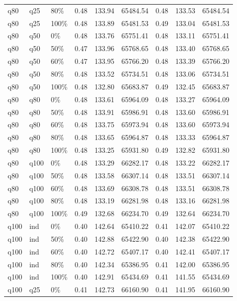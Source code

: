 \begin{longtable}{lllrrrrrr}
  q80 & q25 & 80\% & 0.48 & 133.94 & 65484.54 & 0.48 & 133.53 & 65484.54 \\ 
  q80 & q25 & 100\% & 0.48 & 133.89 & 65481.53 & 0.49 & 133.04 & 65481.53 \\ 
  q80 & q50 & 0\% & 0.48 & 133.76 & 65751.41 & 0.48 & 133.11 & 65751.41 \\ 
  q80 & q50 & 50\% & 0.47 & 133.96 & 65768.65 & 0.48 & 133.40 & 65768.65 \\ 
  q80 & q50 & 60\% & 0.47 & 133.95 & 65766.20 & 0.48 & 133.39 & 65766.20 \\ 
  q80 & q50 & 80\% & 0.48 & 133.52 & 65734.51 & 0.48 & 133.06 & 65734.51 \\ 
  q80 & q50 & 100\% & 0.48 & 132.80 & 65683.87 & 0.49 & 132.45 & 65683.87 \\ 
  q80 & q80 & 0\% & 0.48 & 133.61 & 65964.09 & 0.48 & 133.27 & 65964.09 \\ 
  q80 & q80 & 50\% & 0.48 & 133.91 & 65986.91 & 0.48 & 133.60 & 65986.91 \\ 
  q80 & q80 & 60\% & 0.48 & 133.75 & 65973.94 & 0.48 & 133.60 & 65973.94 \\ 
  q80 & q80 & 80\% & 0.48 & 133.65 & 65964.87 & 0.48 & 133.33 & 65964.87 \\ 
  q80 & q80 & 100\% & 0.48 & 133.25 & 65931.80 & 0.49 & 132.82 & 65931.80 \\ 
  q80 & q100 & 0\% & 0.48 & 133.29 & 66282.17 & 0.48 & 133.22 & 66282.17 \\ 
  q80 & q100 & 50\% & 0.48 & 133.58 & 66307.14 & 0.48 & 133.51 & 66307.14 \\ 
  q80 & q100 & 60\% & 0.48 & 133.69 & 66308.78 & 0.48 & 133.51 & 66308.78 \\ 
  q80 & q100 & 80\% & 0.48 & 133.19 & 66281.98 & 0.48 & 133.16 & 66281.98 \\ 
  q80 & q100 & 100\% & 0.49 & 132.68 & 66234.70 & 0.49 & 132.64 & 66234.70 \\ 
  q100 & ind & 0\% & 0.40 & 142.64 & 65410.22 & 0.41 & 142.07 & 65410.22 \\ 
  q100 & ind & 50\% & 0.40 & 142.88 & 65422.90 & 0.40 & 142.38 & 65422.90 \\ 
  q100 & ind & 60\% & 0.40 & 142.72 & 65407.17 & 0.40 & 142.41 & 65407.17 \\ 
  q100 & ind & 80\% & 0.40 & 142.34 & 65386.95 & 0.41 & 142.00 & 65386.95 \\ 
  q100 & ind & 100\% & 0.40 & 142.91 & 65434.69 & 0.41 & 141.55 & 65434.69 \\ 
  q100 & q25 & 0\% & 0.41 & 142.73 & 66160.90 & 0.41 & 141.95 & 66160.90 \\ 

\end{longtable}
